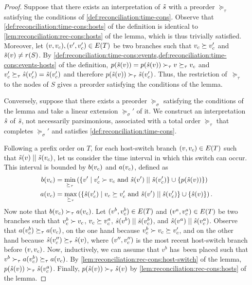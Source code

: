 \begin{proof}
    Suppose that there exists an interpretation of \(\tilde{s}\) with a preorder \(\succeq_\tau\) satisfying the conditions of \cref{def:reconciliation:time-cons}.
    Observe that \cref{def:reconciliation:time-cons:hosts} of the definition is identical to \cref{lem:reconciliation:rec-cons:hosts} of the lemma, which is thus trivially satisfied.
    Moreover, let \((v, v_c), (v', v'_c) \in E(T)\) be two branches such that \(v_c \succeq v'_c\) and \(\tilde{s}(v) \neq r(S)\).
    By \cref{def:reconciliation:time-cons:events,def:reconciliation:time-cons:events-hosts} of the definition, \(p(\tilde{s}(v)) = p(\hat{s}(v)) \succ_\tau v \succeq_\tau v_c\) and \(v'_c \succeq_\tau \hat{s}(v'_c) = \tilde{s}(v'_c)\) and therefore \(p(\tilde{s}(v)) \succ_\tau \tilde{s}(v'_c)\).
    Thus, the restriction of~\(\succeq_\tau\) to the nodes of \(S\) gives a preorder satisfying the conditions of the lemma.

    Conversely, suppose that there exists a preorder \(\succeq_\sigma\) satisfying the conditions of the lemma and take a linear extension \(\succeq_\sigma'\) of it.
    We construct an interpretation \(\hat{s}\) of \(\tilde{s}\), not necessarily parsimonious, associated with a total order \(\succeq_\tau\) that completes \(\succeq_\sigma'\) and satisfies \cref{def:reconciliation:time-cons}.

    Following a prefix order on \(T\), for each host-switch branch \((v, v_c) \in E(T)\) such that \(\tilde{s}(v) \mathrel{||} \tilde{s}(v_c)\), let us consider the time interval in which this switch can occur.
    This interval is bounded by \(b(v_c)\) and \(a(v_c)\), defined as
    \begin{align*}
        b(v_c) &= \min_{\succeq_\tau}\left(\{v' \mid v'_c \succ v_c \text{ and } \hat{s}(v') \mathrel{||} \hat{s}(v'_c)\} \cup \{p(\hat{s}(v))\}\right) \\
        a(v_c) &= \max_{\succeq_\tau}\left(\{\hat{s}(v'_c) \mid v_c \succeq v'_c \text{ and } \hat{s}(v') \mathrel{||} \hat{s}(v'_c)\} \cup \{\hat{s}(v)\}\right).
    \end{align*}
    Now note that \(b(v_c) \succ_\tau a(v_c)\).
    Let \((v^b, v^b_c) \in E(T)\) and \((v^a, v^a_c) \in E(T)\) be two branches such that \(v^b_c \succ v_c\), \(v_c \succeq v^a_c\), \(\hat{s}(v^b) \mathrel{||} \hat{s}(v^b_c)\), and \(\hat{s}(v^a) \mathrel{||} \hat{s}(v^a_c)\).
    Observe that \(a(v^b_c) \succeq_\tau a(v_c)\), on the one hand because \(v^b_c \succ v_c \succeq v'_c\), and on the other hand because \(\hat{s}(v''_c) \succeq_\tau \hat{s}(v)\), where \((v'', v''_c)\) is the most recent host-switch branch before \((v, v_c)\).
    Now, inductively, we can assume that \(v^b\) has~been placed such that \(v^b \succ_\tau a(v^b_c) \succeq_\tau a(v_c)\).
    By \cref{lem:reconciliation:rec-cons:host-switch} of the lemma, \(p(\hat{s}(v)) \succ_\tau \hat{s}(v^a_c)\).
    Finally, \(p(\hat{s}(v)) \succ_\tau \hat{s}(v)\) by \cref{lem:reconciliation:rec-cons:hosts} of the lemma.


\end{proof}
